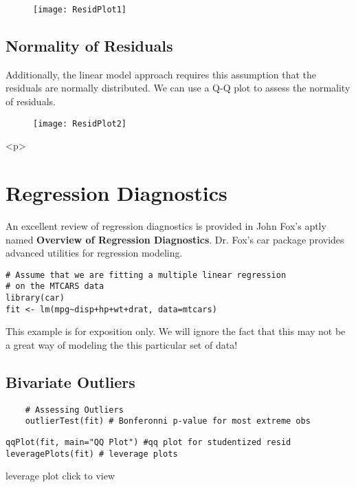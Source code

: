 \documentclass{article}
\begin{document}
\begin{figure}
\centering
\texttt{[image: ResidPlot1]}
\end{figure}

\subsection{Normality of Residuals}
Additionally, the linear model approach requires this assumption that the residuals are normally
distributed. We can use a Q-Q plot to assess the normality of residuals.
\begin{figure}
\centering
\texttt{[image: ResidPlot2]}
\end{figure}

<p>
\section{Regression Diagnostics}

An excellent review of regression diagnostics is provided in John Fox's aptly named \textbf{Overview of Regression Diagnostics}. Dr. Fox's car package provides advanced utilities for regression modeling.
\begin{framed}
	\begin{verbatim}
# Assume that we are fitting a multiple linear regression
# on the MTCARS data
library(car)
fit <- lm(mpg~disp+hp+wt+drat, data=mtcars)
	\end{verbatim}
\end{framed}

This example is for exposition only. We will ignore the fact that this may not be a great way of modeling the this particular set of data!

\subsection{Bivariate Outliers}

\begin{framed}
	\begin{verbatim}
	# Assessing Outliers
	outlierTest(fit) # Bonferonni p-value for most extreme obs

	\end{verbatim}
\end{framed}
\begin{framed}
	\begin{verbatim}
qqPlot(fit, main="QQ Plot") #qq plot for studentized resid 
leveragePlots(fit) # leverage plots
	\end{verbatim}
\end{framed}
leverage plot click to view
\end{document}
